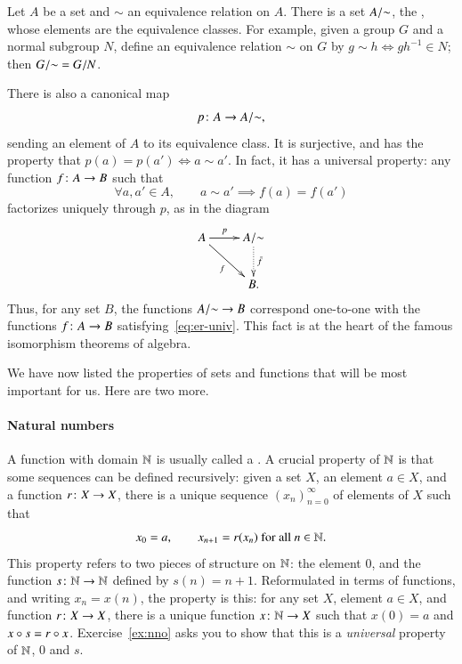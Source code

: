 Let $A$ be a set and $\sim$ an equivalence%
%
%
relation on $A$.  There is a set $A/\mathord{\sim}$,%
%
%
the ,%
%
%
%
whose elements are the equivalence classes.  For example, given a group $G$
and a normal subgroup $N$, define an equivalence relation $\sim$ on $G$ by
$g \sim h \iff gh^{-1} \in N$; then $G/\mathord{\sim} = G/N$.

There is also a canonical map
\[
p\from A \to \qer{A}{\sim},
\]
sending an element of $A$ to its equivalence class.  It is surjective, and has
the property that $p(a) = p(a') \iff a \sim a'$.  In fact, it has a universal
property: any function $f\from A \to B$ such that
%
\begin{equation}
\label{eq:er-univ}
\forall a, a' \in A,
\qquad
a \sim a'
\implies
f(a) = f(a')
\end{equation}
%
factorizes uniquely through $p$, as in the diagram
\[
\xymatrix{
A \ar[r]^-p \ar[rd]_{f}  &\qer{A}{\sim} \ar@{.>}[d]^{\bar{f}}    \\
                        &B.
}
\]
Thus, for any set $B$, the functions $A/\mathord{\sim} \to B$ correspond
one-to-one with the functions $f\from A \to B$
satisfying~\eqref{eq:er-univ}.  This fact is at the heart of the famous
isomorphism theorems of algebra.

\subjectchange

We have now listed the properties of sets and functions that will be most
important for us.  Here are two more.

\paragraph*{Natural numbers}
%
%
A function with domain $\mathbb{N}$ is usually called a .%
%
%
A crucial property of $\mathbb{N}$ is that some sequences can be defined
recursively: given a set $X$, an element $a \in X$, and a function $r\from
X \to X$, there is a unique sequence $(x_n)_{n = 0}^\infty$ of elements of
$X$ such that
\[
x_0 = a,
\qquad
x_{n + 1} = r(x_n) \text{ for all } n \in \mathbb{N}.
\]
This property refers to two pieces of structure on $\mathbb{N}$: the element $0$,
and the function $s\from \nat \to \nat$ defined by $s(n) = n + 1$.
Reformulated in terms of functions, and writing $x_n = x(n)$, the property
is this: for any set $X$, element $a \in X$, and function $r\from X \to X$,
there is a unique function $x\from \nat \to X$ such that $x(0) = a$ and
$x\mathbin{\circ} s = r \mathbin{\circ} x$.  Exercise~\ref{ex:nno} asks you to show that this is a
\emph{universal} property of $\mathbb{N}$, $0$ and $s$.

